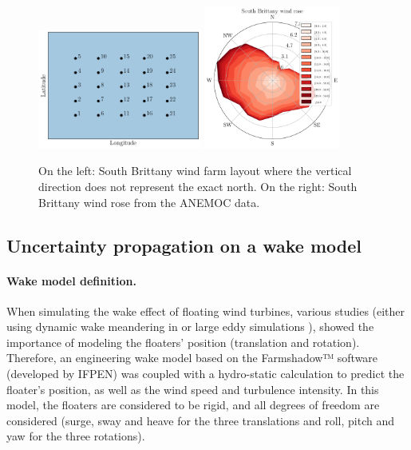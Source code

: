 \begin{figure}
    \centering
    \includegraphics[width=0.48\textwidth]{part2/figures/WAKE/layout_SB.png}
    \includegraphics[width=0.4\textwidth]{../numerical_experiments/chapter3/figures/SB_wind_rose.png}
    \caption{On the left: South Brittany wind farm layout where the vertical direction does not represent the exact north. On the right: South Brittany wind rose from the ANEMOC data.}
    \label{fig:SB-farm}
\end{figure}


\subsection{Uncertainty propagation on a wake model}\label{sec:UQ-wake}

\paragraph{Wake model definition.}
When simulating the wake effect of floating wind turbines, various studies (either using dynamic wake meandering in \citealp{wise_2020} or large eddy simulations \citealp{johlas_2020_wake_LES}), showed the importance of modeling the floaters' position (translation and rotation). 
Therefore, an engineering wake model based on the Farmshadow™ software (developed by IFPEN) was coupled with a hydro-static calculation to predict the floater's position, as well as the wind speed and turbulence intensity. 
In this model, the floaters are considered to be rigid, and all degrees of freedom are considered (surge, sway and heave for the three translations and roll, pitch and yaw for the three rotations). 

